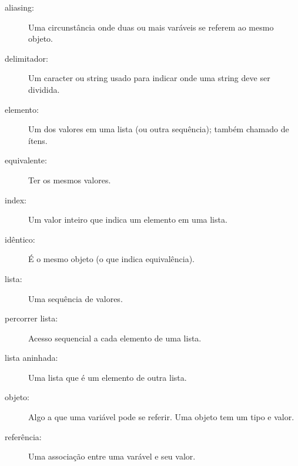\begin{description}

\item[aliasing:] Uma circunstância onde duas ou mais varáveis se referem ao mesmo objeto.

\item[delimitador:] Um caracter ou string usado para indicar onde uma string deve ser dividida.

\item[elemento:] Um dos valores em uma lista (ou outra sequência);
também chamado de ítens.

\item[equivalente:] Ter os mesmos valores.

\item[index:] Um valor inteiro que indica um elemento em uma lista.

\item[idêntico:] É o mesmo objeto (o que indica equivalência).

\item[lista:] Uma sequência de valores.

\item[percorrer lista:] Acesso sequencial a cada elemento de uma lista.

\item[lista aninhada:] Uma lista que é um elemento de outra lista.

\item[objeto:] Algo a que uma variável pode se referir. Uma objeto tem um tipo e valor.

\item[referência:] Uma associação entre uma varável e seu valor.






\end{description}
